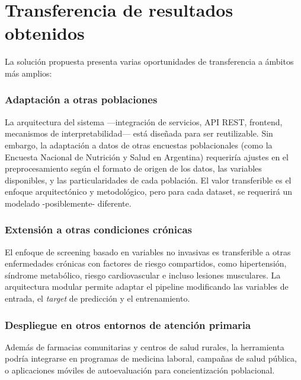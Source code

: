 \documentclass[12pt, a4paper]{report}
\begin{document}
\chapter{Transferencia de resultados obtenidos}

La solución propuesta presenta varias oportunidades de transferencia a ámbitos más amplios:

\subsection*{Adaptación a otras poblaciones}

La arquitectura del sistema —integración de servicios, API REST, frontend, mecanismos de interpretabilidad— está diseñada para ser reutilizable. Sin embargo, la adaptación a datos de otras encuestas poblacionales (como la Encuesta Nacional de Nutrición y Salud en Argentina) requeriría ajustes en el preprocesamiento según el formato de origen de los datos, las variables disponibles, y las particularidades de cada población. El valor transferible es el enfoque arquitectónico y metodológico, pero para cada dataset, se requerirá un modelado -posiblemente- diferente.

\subsection*{Extensión a otras condiciones crónicas}

El enfoque de screening basado en variables no invasivas es transferible a otras enfermedades crónicas con factores de riesgo compartidos, como hipertensión, síndrome metabólico, riesgo cardiovascular e incluso lesiones musculares. La arquitectura modular permite adaptar el pipeline modificando las variables de entrada, el \textit{target} de predicción y el entrenamiento.

\subsection*{Despliegue en otros entornos de atención primaria}

Además de farmacias comunitarias y centros de salud rurales, la herramienta podría integrarse en programas de medicina laboral, campañas de salud pública, o aplicaciones móviles de autoevaluación para concientización poblacional.
\end{document}
